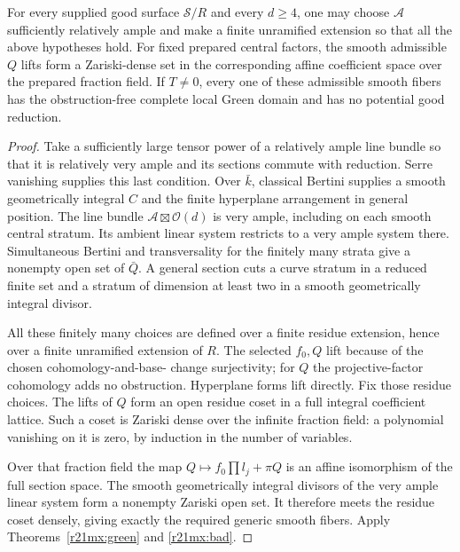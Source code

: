\begin{proposition}
\label{r21mx:existence}
For every supplied good surface $\mathcal S/R$ and every $d\ge4$,
one may choose $\mathcal A$ sufficiently relatively ample and make a
finite unramified extension so that all the above hypotheses hold.
For fixed prepared central factors, the smooth admissible $Q$ lifts
form a Zariski-dense set in the corresponding affine coefficient
space over the prepared fraction field.  If $T\ne0$, every one of
these admissible smooth fibers has the obstruction-free complete
local Green domain and has no potential good reduction.
\end{proposition}

\begin{proof}
Take a sufficiently large tensor power of a relatively ample line
bundle so that it is relatively very ample and its sections commute
with reduction.  Serre vanishing supplies this last condition.
Over $\bar k$, classical Bertini supplies a smooth geometrically
integral $C$ and the finite hyperplane arrangement in general
position.  The line bundle $\mathcal A\boxtimes\mathcal O(d)$ is
very ample, including on each smooth central stratum.  Its ambient
linear system restricts to a very ample system there.  Simultaneous
Bertini and transversality for the finitely many strata give a
nonempty open set of $\bar Q$.  A general section cuts a curve
stratum in a reduced finite set and a stratum of dimension at least
two in a smooth geometrically integral divisor.

All these finitely many choices are defined over a finite residue
extension, hence over a finite unramified extension of $R$.
The selected $f_0,Q$ lift because of the chosen cohomology-and-base-
change surjectivity; for $Q$ the projective-factor cohomology adds
no obstruction.  Hyperplane forms lift directly.  Fix those residue
choices.  The lifts of $Q$ form an open residue coset in a full
integral coefficient lattice.  Such a coset is Zariski dense over
the infinite fraction field: a polynomial vanishing on it is zero,
by induction in the number of variables.

Over that fraction field the map $Q\mapsto f_0\prod l_j+\pi Q$
is an affine isomorphism of the full section space.  The smooth
geometrically integral divisors of the very ample linear system
form a nonempty Zariski open set.  It therefore meets the residue
coset densely, giving exactly the required generic smooth fibers.
Apply Theorems~\ref{r21mx:green} and \ref{r21mx:bad}.
\end{proof}

